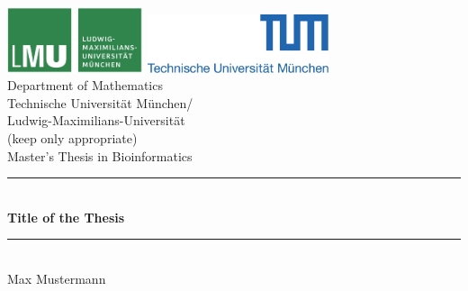 \documentclass[pdftex,12pt,a4paper]{report}
\newcommand{\HRule}{\rule{\linewidth}{0.5mm}}
\begin{document}
\begin{titlepage}


\sffamily

\begin{center}


\includegraphics[width=0.3\textwidth]{logo2.jpg}
\hfill
\includegraphics[width=0.4\textwidth]{logo1.jpg}  
\\[5cm]

{\LARGE Department of Mathematics}\\[0.5cm]
{Technische Universit\"at M\"unchen/}\\
{Ludwig-Maximilians-Universit\"at}\\
(keep only appropriate)\\[2cm]
{\Large Master's Thesis in Bioinformatics}\\[1.5cm]

\HRule \\[0.4cm]
{ \huge \bfseries Title of the Thesis}\\[0.4cm]

\HRule \\[1.5cm]

{\Large Max Mustermann}\\[2.5cm]

\vfill
\end{center}
\end{titlepage}
\pagestyle{empty}
\end{document}
